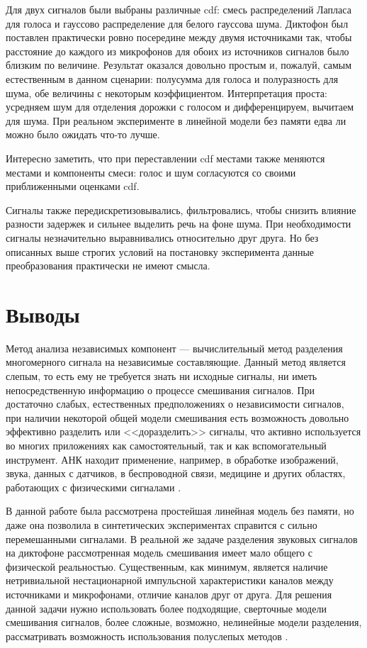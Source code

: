 \documentclass[a4paper,12pt]{article}
\begin{document}
	Для двух сигналов были выбраны различные cdf: смесь распределений Лапласа для голоса и гауссово распределение для белого гауссова шума. Диктофон был поставлен практически ровно посередине между двумя источниками так, чтобы расстояние до каждого из микрофонов для обоих из источников сигналов было близким по величине. Результат оказался довольно простым и, пожалуй, самым естественным в данном сценарии: полусумма для голоса и полуразность для шума, обе величины с некоторым коэффициентом. Интерпретация проста: усредняем шум для отделения дорожки с голосом и дифференцируем, вычитаем для шума. При реальном эксперименте в линейной модели без памяти едва ли можно было ожидать что-то лучше.
	
	Интересно заметить, что при переставлении cdf местами также меняются местами и компоненты смеси: голос и шум согласуются со своими приближенными оценками cdf.
	
	Сигналы также передискретизовывались, фильтровались, чтобы снизить влияние разности задержек и сильнее выделить речь на фоне шума. При необходимости сигналы незначительно выравнивались относительно друг друга. Но без описанных выше строгих условий на постановку эксперимента данные преобразования практически не имеют смысла.
	
	\section*{Выводы}
	
	Метод анализа независимых компонент --- вычислительный метод разделения многомерного сигнала на независимые составляющие. Данный метод является слепым, то есть ему не требуется знать ни исходные сигналы, ни иметь непосредственную информацию о процессе смешивания сигналов. При достаточно слабых, естественных предположениях о независимости сигналов, при наличии некоторой общей модели смешивания есть возможность довольно эффективно разделить или <<доразделить>> сигналы, что активно используется во многих приложениях как самостоятельный, так и как вспомогательный инструмент. АНК находит применение, например, в обработке изображений, звука, данных с датчиков, в беспроводной связи, медицине и других областях, работающих с физическими сигналами \cite{comon2010ica}. 
	
	В данной работе была рассмотрена простейшая линейная модель без памяти, но даже она позволила в синтетических экспериментах справится с сильно перемешанными сигналами. В реальной же задаче разделения звуковых сигналов на диктофоне рассмотренная модель смешивания имеет мало общего с физической реальностью. Существенным, как минимум, является наличие нетривиальной нестационарной импульсной характеристики каналов между источниками и микрофонами, отличие каналов друг от друга. Для решения данной задачи нужно использовать более подходящие, сверточные модели смешивания сигналов, более сложные, возможно, нелинейные модели разделения, рассматривать возможность использования полуслепых методов \cite{comon2010ica}.
	
\end{document}
